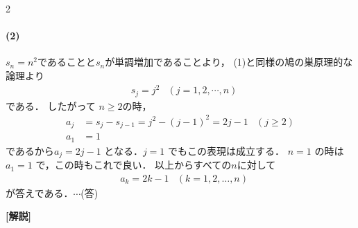 \documentclass[../../main.tex]{subfiles}
\begin{document}
\begin{multicols}{2}
  \paragraph{(2)}
  $s_n=n^2$であることと$s_n$が単調増加であることより，
  (1)と同様の鳩の巣原理的な論理より
  \begin{align}
    & s_j = j^2 & (j=1,2,\cdots,n)
  \end{align}
  である．
  したがって $n \ge 2$の時，
  \begin{align}
    a_j & = s_{j}-s_{j-1} = j^2 - (j-1)^2 = 2j-1 & (j \ge 2) \\
    a_1 & = 1                                    &
  \end{align}
  であるから$a_j = 2j-1$ となる．$j=1$ でもこの表現は成立する．
  $n=1$ の時は$a_1=1$ で，この時もこれで良い．
  以上からすべての$n$に対して
  \begin{align}
    & a_k = 2k-1 & (k=1, 2, \dots, n)
  \end{align}
  が答えである．$\cdots$(答)

  {\bf [解説]}

  \newpage
\end{multicols}
\end{document}
